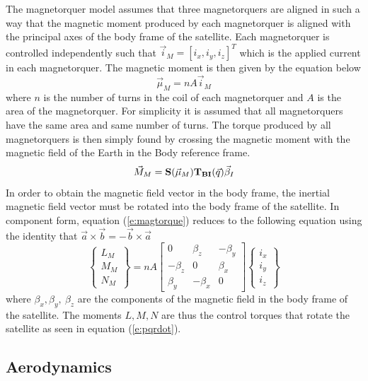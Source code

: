 \documentclass{article}
\begin{document}
The magnetorquer model assumes that three magnetorquers are aligned in
such a way that the magnetic moment produced by each magnetorquer is
aligned with the principal axes of the body frame of the
satellite. Each magnetorquer is controlled independently such that
$\vec{i}_M = [i_x,i_y,i_z]^T$ which is the applied current in each
magnetorquer. The magnetic moment is then given by the equation below 
\begin{equation}\label{e:magmoment}
  \vec{\mu}_M = nA\vec{i}_M
\end{equation}
where $n$ is the number of turns in the coil 
of each magnetorquer and $A$ is the area of the magnetorquer. For
simplicity it is assumed that all magnetorquers have the same area and
same number of turns. The torque produced by all magnetorquers is then
simply found by crossing the magnetic moment with the magnetic field
of the Earth in the Body reference frame.
\begin{equation}\label{e:magtorque}
  \vec{M}_M = {\bf S}(\vec{\mu}_M){\bf T_{BI}}(\vec{q})\vec{\beta}_I
\end{equation}
In order to obtain the magnetic field vector in the body frame, the
inertial magnetic field vector must be rotated into the body frame of
the satellite. In component form, equation (\ref{e:magtorque}) reduces to the following
equation using the identity that $\vec{a}\times\vec{b}=-\vec{b}\times\vec{a}$
\begin{equation}\label{e:magtorquecomponent}
  \begin{Bmatrix} L_M \\ M_M \\ N_M \end{Bmatrix} = nA\begin{bmatrix} 0 & \beta_z & -\beta_y \\ -\beta_z & 0 &
  \beta_x \\ \beta_y & -\beta_x & 0 \end{bmatrix}\begin{Bmatrix} i_{x}
    \\ i_{y} \\ i_{z} \end{Bmatrix}
\end{equation}
where $\beta_x,\beta_y,~\beta_z$ are the components of the magnetic
field in the body frame of the satellite. The moments $L,M,N$ are thus
the control torques that rotate the satellite as seen in equation
(\ref{e:pqrdot}).

\subsection{Aerodynamics}\label{s:aerodynamics}
\end{document}
